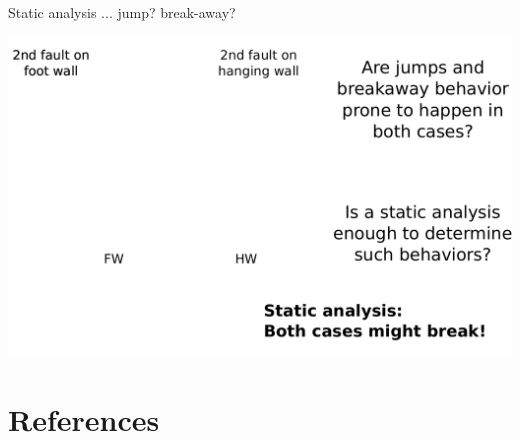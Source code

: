 \documentclass{beamer}
\newcommand\dirbiblio{../../biblio/}
\begin{document}
\begin{frame}
 {Static analysis ... jump? break-away?}
 
 \begin{center}
 \begin{minipage}{0.7\linewidth}
  \includegraphics[width=1\linewidth]{images/static_analysis}
 \end{minipage}
 \end{center}

 
\end{frame}



\section*{References}
\begin{frame}

    {\tiny  }							    

\end{frame}
\end{document}
